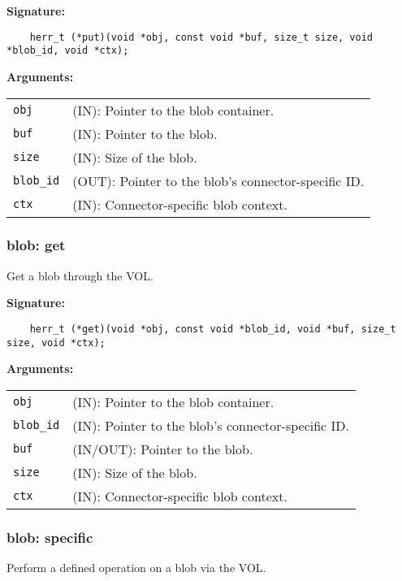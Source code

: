 \begin{mdframed}[style=bgbox]
\textbf{Signature:}
\begin{lstlisting}
    herr_t (*put)(void *obj, const void *buf, size_t size, void *blob_id, void *ctx);
\end{lstlisting}

\textbf{Arguments:}\\
\begin{tabular}{l p{13.5cm}}
  \texttt{obj} & (IN): Pointer to the blob container.\\
  \texttt{buf} & (IN): Pointer to the blob.\\
  \texttt{size} & (IN): Size of the blob.\\
  \texttt{blob\_id} & (OUT): Pointer to the blob's connector-specific ID.\\
  \texttt{ctx} & (IN): Connector-specific blob context.\\
\end{tabular}
\end{mdframed}

\subsubsection{blob: get}
Get a blob through the VOL.

\begin{mdframed}[style=bgbox]
\textbf{Signature:}
\begin{lstlisting}
    herr_t (*get)(void *obj, const void *blob_id, void *buf, size_t size, void *ctx);
\end{lstlisting}

\textbf{Arguments:}\\
\begin{tabular}{l p{13.5cm}}
  \texttt{obj} & (IN): Pointer to the blob container.\\
  \texttt{blob\_id} & (IN): Pointer to the blob's connector-specific ID.\\
  \texttt{buf} & (IN/OUT): Pointer to the blob.\\
  \texttt{size} & (IN): Size of the blob.\\
  \texttt{ctx} & (IN): Connector-specific blob context.\\
\end{tabular}
\end{mdframed}

\subsubsection{blob: specific}
Perform a defined operation on a blob via the VOL.

